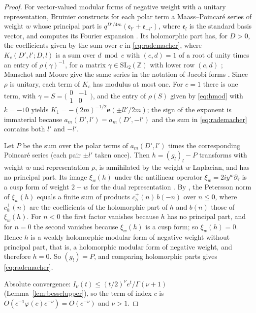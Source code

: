 \documentclass[11pt]{amsart}
\theoremstyle{definition}
\newcommand{\ZZ}{\mathbb{Z}}
\newcommand{\e}{\mathbf{e}}
\begin{document}
\begin{proof}
For vector-valued modular forms of negative weight with a unitary representation, Bruinier constructs for each polar term a Maass--Poincar\'e series of weight $w$ whose principal part is $q^{D'/4m}(\mathfrak e_{l'}+\mathfrak e_{-l'})$, where $\mathfrak e_l$ is the standard basis vector, and computes its Fourier expansion \cite[Def.~1.8, Prop.~1.10]{Bru02}. Its holomorphic part has, for $D>0$, the coefficients given by the sum over $c$ in \eqref{eq:rademacher}, where $K_c(D',l';D,l)$ is a sum over $d\bmod c$ with $(c,d)=1$ of a root of unity times an entry of $\rho(\gamma)^{-1}$, for a matrix $\gamma\in\mathrm{SL}_2(\ZZ)$ with lower row $(c,d)$ \cite[Prop.~1.10]{Bru02}; Manschot and Moore give the same series in the notation of Jacobi forms \cite[\S\S2--3]{MM10}. Since $\rho$ is unitary, each term of $K_c$ has modulus at most one. For $c=1$ there is one term, with $\gamma=S=\bigl(\begin{smallmatrix}0&-1\\1&0\end{smallmatrix}\bigr)$, and the entry of $\rho(S)$ given by \eqref{eq:hmod} with $k=-10$ yields $K_1=-(2m)^{-1/2}\e(\pm ll'/2m)$; the sign of the exponent is immaterial because $a_m(D',l')=a_m(D',-l')$ and the sum in \eqref{eq:rademacher} contains both $l'$ and $-l'$.

Let $P$ be the sum over the polar terms of $a_m(D',l')$ times the corresponding Poincar\'e series (each pair $\pm l'$ taken once). Then $h=(g_l)_l-P$ transforms with weight $w$ and representation $\rho$, is annihilated by the weight $w$ Laplacian, and has no principal part. Its image $\xi_w(h)$ under the antilinear operator $\xi_w=2iy^w\overline{\partial_{\bar\tau}}$ is a cusp form of weight $2-w$ for the dual representation \cite[Prop.~3.2]{BF04}. By \cite[Prop.~3.5]{BF04}, the Petersson norm of $\xi_w(h)$ equals a finite sum of products $c_h^+(n)\,b(-n)$ over $n\le0$, where $c_h^+(n)$ are the coefficients of the holomorphic part of $h$ and $b(n)$ those of $\xi_w(h)$. For $n<0$ the first factor vanishes because $h$ has no principal part, and for $n=0$ the second vanishes because $\xi_w(h)$ is a cusp form; so $\xi_w(h)=0$. Hence $h$ is a weakly holomorphic modular form of negative weight without principal part, that is, a holomorphic modular form of negative weight, and therefore $h=0$. So $(g_l)=P$, and comparing holomorphic parts gives \eqref{eq:rademacher}.

Absolute convergence: $I_\nu(t)\le(t/2)^\nu e^t/\Gamma(\nu+1)$ (Lemma~\ref{lem:besselupper}), so the term of index $c$ is $O(c^{-1}\varphi(c)c^{-\nu})=O(c^{-\nu})$ and $\nu>1$.
\end{proof}
\end{document}
